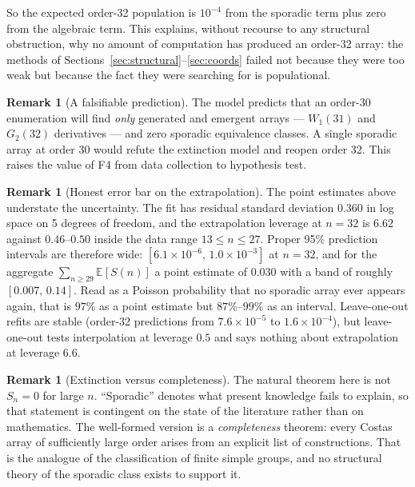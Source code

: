 \documentclass[11pt,a4paper]{article}
\theoremstyle{definition}
\newtheorem{remark}[theorem]{Remark}
\begin{document}
So the expected order-32 population is $10^{-4}$ from the sporadic term plus zero
from the algebraic term. This explains, without recourse to any structural
obstruction, why no amount of computation has produced an order-32 array: the
methods of Sections~\ref{sec:structural}--\ref{sec:coords} failed not because
they were too weak but because the fact they were searching for is populational.

\begin{remark}[A falsifiable prediction]
\label{rem:falsifiable}
The model predicts that an order-30 enumeration will find \emph{only} generated
and emergent arrays --- $W_1(31)$ and $G_2(32)$ derivatives --- and zero
sporadic equivalence classes. A single sporadic array at order 30 would refute
the extinction model and reopen order 32. This raises the value of F4 from data
collection to hypothesis test.
\end{remark}

\begin{remark}[Honest error bar on the extrapolation]
\label{rem:errorbar}
The point estimates above understate the uncertainty. The fit has residual
standard deviation $0.360$ in log space on 5 degrees of freedom, and the
extrapolation leverage at $n=32$ is $6.62$ against $0.46$--$0.50$ inside the data
range $13\le n\le27$. Proper 95\% prediction intervals are therefore wide:
$[6.1\times10^{-6},\,1.0\times10^{-3}]$ at $n=32$, and for the aggregate
$\sum_{n\ge29}\mathbb E[S(n)]$ a point estimate of $0.030$ with a band of roughly
$[0.007,\,0.14]$. Read as a Poisson probability that no sporadic array ever
appears again, that is $97\%$ as a point estimate but $87\%$--$99\%$ as an
interval. Leave-one-out refits are stable (order-32 predictions from
$7.6\times10^{-5}$ to $1.6\times10^{-4}$), but leave-one-out tests interpolation
at leverage $0.5$ and says nothing about extrapolation at leverage $6.6$.
\end{remark}

\begin{remark}[Extinction versus completeness]
The natural theorem here is not $S_n=0$ for large $n$. ``Sporadic'' denotes what
present knowledge fails to explain, so that statement is contingent on the state
of the literature rather than on mathematics. The well-formed version is a
\emph{completeness} theorem: every Costas array of sufficiently large order
arises from an explicit list of constructions. That is the analogue of the
classification of finite simple groups, and no structural theory of the sporadic
class exists to support it.
\end{remark}
\end{document}
